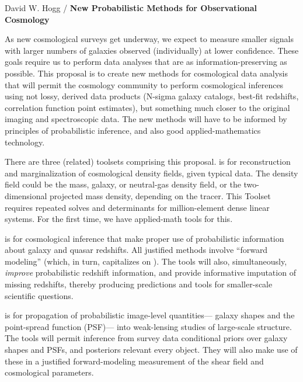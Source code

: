 \documentclass[12pt]{article}
\begin{document}
\sloppy\sloppypar\thispagestyle{empty}

\noindent
\textsf{David W. Hogg / \textbf{New Probabilistic Methods for Observational Cosmology}} %
\smallskip

As new cosmological surveys get underway,
we expect to measure smaller signals with larger numbers of galaxies
observed (individually) at lower confidence.
These goals require us to perform data
analyses that are as information-preserving as possible.
This proposal is to create new methods for cosmological data analysis
that will permit the cosmology community to perform cosmological
inferences using not lossy, derived data products (N-sigma galaxy
catalogs, best-fit redshifts, correlation function point estimates),
but something much closer to the original imaging and spectroscopic
data.
The new methods will have to be informed by principles of
probabilistic inference, and also good applied-mathematics technology.

There are three (related) toolsets comprising this proposal.
 is for reconstruction and marginalization
of cosmological density fields, given typical data.
The density field could be the mass, galaxy, or 
neutral-gas density field, or the two-dimensional projected mass density,
depending on the tracer.
This Toolset requires repeated solves and determinants for
million-element dense linear systems.  For the first time, we
have applied-math tools for this.

 is for cosmological inference that make proper
use of probabilistic information about galaxy and quasar redshifts.
All justified methods involve ``forward modeling'' (which, in turn,
capitalizes on ).  The tools will also, simultaneously,
\emph{improve} probabilistic redshift information, and provide
informative imputation of missing redshifts, thereby producing
predictions and tools for smaller-scale scientific questions.

 is for propagation of probabilistic image-level quantities---%
galaxy shapes and the point-spread function (PSF)---%
into weak-lensing studies of large-scale structure.
The tools will permit inference from survey data conditional priors over
galaxy shapes and PSFs, and posteriors relevant every object.
They will also make use of these in a justified forward-modeling
measurement of the shear field and cosmological parameters.
\end{document}
